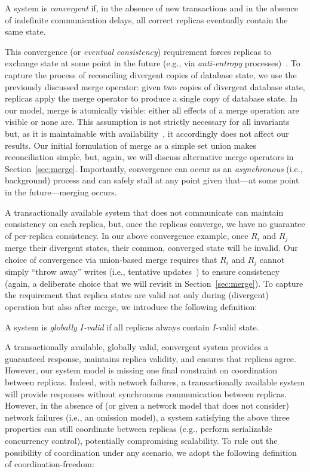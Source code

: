 \begin{definition}A system is \textit{convergent} if, in the
absence of new transactions and in the absence of indefinite
communication delays, all correct replicas eventually contain the same
state.
\end{definition}

This convergence (or \textit{eventual consistency}) requirement forces
replicas to exchange state at some point in the future (e.g., via
\textit{anti-entropy} processes)~\cite{vogels-defs,bayou}. To capture
the process of reconciling divergent copies of database state, we use
the previously discussed merge operator: given two copies of divergent
database state, replicas apply the merge operator to produce a single
copy of database state. In our model, merge is atomically visible:
either all effects of a merge operation are visible or none are. This
assumption is not strictly necessary for all invariants but, as it is
maintainable with availability~\cite{ramp-txns}, it accordingly does
not affect our results. Our initial formulation of merge as a simple
set union makes reconciliation simple, but, again, we will discuss
alternative merge operators in Section~\ref{sec:merge}. Importantly,
convergence can occur as an \textit{asynchronous} (i.e., background)
process and can safely stall at any point given that---at some point
in the future---merging occurs.

 A transactionally available system
that does not communicate can maintain consistency on each replica,
but, once the replicas converge, we have no guarantee of per-replica
consistency. In our above convergence example, once $R_i$ and $R_j$
merge their divergent states, their common, converged state will be
invalid. Our choice of convergence via union-based merge requires that
$R_i$ and $R_j$ cannot simply ``throw away'' writes (i.e., tentative
updates~\cite{tamer-book}) to ensure consistency (again, a deliberate
choice that we will revisit in Section~\ref{sec:merge}). To capture
the requirement that replica states are valid not only during
(divergent) operation but also after merge, we introduce the following
definition:

\begin{definition}
A system is \textit{globally $I$-valid} if all replicas always contain
$I$-valid state.
\end{definition}

 A transactionally available, globally valid,
convergent system provides a guaranteed response, maintains replica
validity, and ensures that replicas agree. However, our system model
is missing one final constraint on coordination between
replicas. Indeed, with network failures, a transactionally available
system will provide responses without synchronous communication
between replicas. However, in the absence of (or given a network model
that does not consider) network failures (i.e., an omission model), a
system satisfying the above three properties can still coordinate
between replicas (e.g., perform serializable concurrency control),
potentially compromising scalability. To rule out the possibility of
coordination under any scenario, we adopt the following definition of
coordination-freedom:

